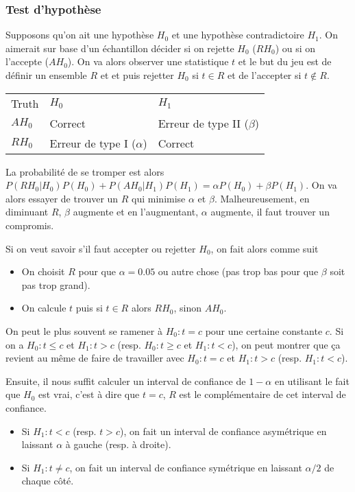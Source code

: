 \subsubsection{Test d'hypothèse}
Supposons qu'on ait une hypothèse $H_0$ et une hypothèse contradictoire $H_1$.
On aimerait sur base d'un échantillon décider si on rejette $H_0$ ($RH_0$) ou si on l'accepte ($AH_0$).
On va alors observer une statistique $t$ et le but du jeu est de définir
un ensemble $R$ et et puis rejetter $H_0$ si $t \in R$ et de l'accepter si $t \notin R$.
\begin{center}
  \begin{tabular}{lll}
    Truth & $H_0$ & $H_1$\\
    $AH_0$ & Correct & Erreur de type II ($\beta$)\\
    $RH_0$ & Erreur de type I ($\alpha$) & Correct
  \end{tabular}
\end{center}
La probabilité de se tromper est alors
$P(RH_0|H_0)P(H_0) + P(AH_0|H_1)P(H_1) = \alpha P(H_0) + \beta P(H_1)$.
On va alors essayer de trouver un $R$ qui minimise $\alpha$ et $\beta$.
Malheureusement, en diminuant $R$, $\beta$ augmente et en l'augmentant, $\alpha$ augmente,
il faut trouver un compromis.

Si on veut savoir s'il faut accepter ou rejetter $H_0$,
on fait alors comme suit
\begin{itemize}
  \item On choisit $R$ pour que $\alpha = 0.05$ ou autre chose (pas trop bas pour que $\beta$ soit pas trop grand).
  \item On calcule $t$ puis si $t \in R$ alors $RH_0$, sinon $AH_0$.
\end{itemize}
On peut le plus souvent se ramener à $H_0: t = c$ pour une certaine constante $c$.
Si on a $H_0: t \leq c$ et $H_1: t > c$ (resp. $H_0: t \geq c$ et $H_1: t < c$),
on peut montrer que ça revient au même de faire de travailler
avec $H_0: t = c$ et $H_1: t > c$ (resp. $H_1: t < c$).

Ensuite, il nous suffit calculer un interval de confiance de $1-\alpha$ en utilisant le fait que $H_0$ est vrai,
c'est à dire que $t = c$, $R$ est le complémentaire de cet interval de confiance.
\begin{itemize}
  \item Si $H_1: t < c$ (resp. $t > c$), on fait un interval de confiance asymétrique en laissant $\alpha$ à gauche (resp. à droite).
  \item Si $H_1: t \neq c$, on fait un interval de confiance symétrique en laissant $\alpha/2$ de chaque côté.
\end{itemize}

